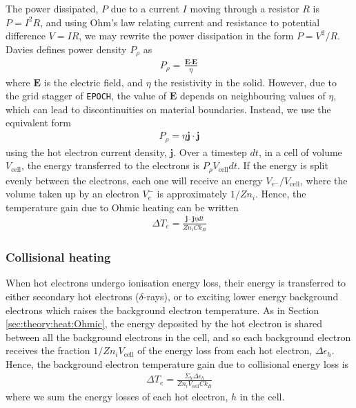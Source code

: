\documentclass[12pt]{article}
\numberwithin{equation}{section}
\begin{document}
The power dissipated, $P$ due to a current $I$ moving through a resistor $R$ is $P=I^2R$, and using Ohm's law relating current and resistance to potential difference $V=IR$, we may rewrite the power dissipation in the form $P = V^2/R$. Davies \cite{hybrid:Davies:2002} defines power density $P_\rho$ as 
%
\begin{align}
  P_\rho = \frac{\textbf{E}\cdot\textbf{E}}{\eta}
\end{align}
%
where $\textbf{E}$ is the electric field, and $\eta$ the resistivity in the solid. However, due to the grid stagger of \texttt{EPOCH}, the value of $\textbf{E}$ depends on neighbouring values of $\eta$, which can lead to discontinuities on material boundaries. Instead, we use the equivalent form
%
\begin{align}
  P_\rho = \eta \textbf{j}\cdot\textbf{j}
\end{align}
%
using the hot electron current density, $\textbf{j}$. Over a timestep $dt$, in a cell of volume $V_\text{cell}$, the energy transferred to the electrons is $P_\rho V_\text{cell} dt$. If the energy is split evenly between the electrons, each one will receive an energy $V_{e^-}/V_\text{cell}$, where the volume taken up by an electron $V_e^-$ is approximately $1/Zn_i$. Hence, the temperature gain due to Ohmic heating can be written
%
\begin{align} \label{eq:theory:heat:Ohmic}
  \Delta T_e = \frac{\textbf{j}\cdot\textbf{j}\eta dt}{Zn_iCk_B}
\end{align}

\subsubsection{Collisional heating} \label{sec:theory:heat:coll}

When hot electrons undergo ionisation energy loss, their energy is transferred to either secondary hot electrons ($\delta$-rays), or to exciting lower energy background electrons which raises the background electron temperature. As in Section \ref{sec:theory:heat:Ohmic}, the energy deposited by the hot electron is shared between all the background electrons in the cell, and so each background electron receives the fraction $1/Zn_iV_\text{cell}$ of the energy loss from each hot electron, $\Delta\epsilon_h$. Hence, the background electron temperature gain due to collisional energy loss is 
%
\begin{align} \label{eq:theory:heat:coll}
  \Delta T_e = \frac{\Sigma_h \Delta \epsilon_h}{Zn_iV_\text{cell}Ck_B}
\end{align}
%
where we sum the energy losses of each hot electron, $h$ in the cell.
\end{document}
